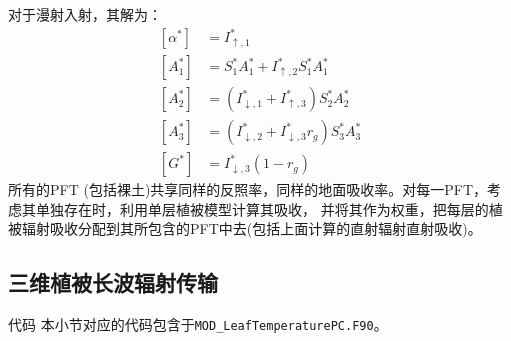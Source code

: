 对于漫射入射，其解为：
\begin{equation}
\begin{aligned}
\left[\alpha^{*}\right] &=I_{\uparrow, 1}^{*} \\[1ex]
\left[A_{1}^{*}\right]& =S_{1}^{*} A_{1}^{*}+I_{\uparrow, 2}^{*} S_{1}^{*} A_{1}^{*} \\[1ex]
\left[A_{2}^{*}\right] &=\left(I_{\downarrow, 1}^{*}+I_{\uparrow, 3}^{*}\right) S_{2}^{*} A_{2}^{*} \\[1ex]
\left[A_{3}^{*}\right] &=\left(I_{\downarrow, 2}^{*}+I_{\downarrow, 3}^{*} r_{g}\right) S_{3}^{*} A_{3}^{*} \\[1ex] 
\left[G^{*}\right] &=I_{\downarrow, 3}^{*}\left(1-r_{g}\right)
\end{aligned}
\end{equation}
所有的PFT (包括裸土)共享同样的反照率，同样的地面吸收率。对每一PFT，考虑其单独存在时，利用单层植被模型计算其吸收，
并将其作为权重，把每层的植被辐射吸收分配到其所包含的PFT中去(包括上面计算的直射辐射直射吸收)。

\subsection{三维植被长波辐射传输}\label{三维植被长波辐射传输}
\begin{mymdframed}{代码}
本小节对应的代码包含于\texttt{MOD\_LeafTemperaturePC.F90}。
\end{mymdframed}

